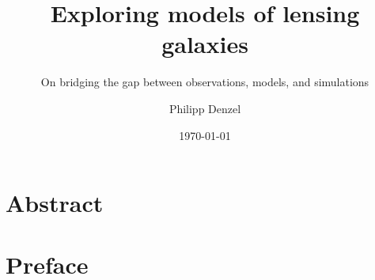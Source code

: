 \documentclass[
    fontsize=10pt,
    twoside=true,
    numbers=noenddot,
]{cls/phdbyphd}
\begin{document}
% 

\titlehead{Doctoral Dissertation}

\subject{Doctoral Dissertation}
\title[Exploring models of lensing galaxies]{
    Exploring models of lensing galaxies
}
\subtitle{On bridging the gap between observations, models, and simulations}

\author[Philipp Denzel]{Philipp Denzel}
\date{\today}
\publishers{University of Z\"urich}

\frontmatter

\dedication{
	For the one who will never read it.\\
	\flushright -- Philipp Denzel
}

\maketitle


\chapter*{Abstract}
    

\chapter*{Preface}
    

\begingroup

    \setlength{\textheight}{23cm}
    \etocstandarddisplaystyle
    \etocstandardlines

    \tableofcontents

    \listoffigures

    \let\cleardoublepage\bigskip
    \let\clearpage\bigskip
\end{document}
